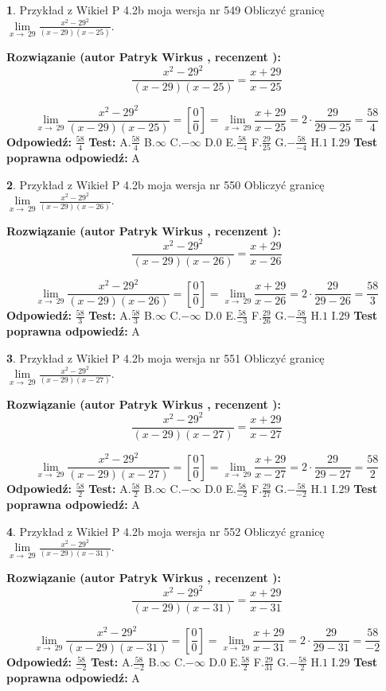 \documentclass[12pt, a4paper]{article}
\theoremstyle{definition} %
\newtheorem{zad}{}
\newcommand{\zadStart}[1]{\begin{zad}#1\newline}
\newcommand{\zadStop}{\end{zad}}
\newcommand{\rozwStart}[2]{\noindent \textbf{Rozwiązanie (autor #1 , recenzent #2): }\newline}
\newcommand{\rozwStop}{\newline}
\newcommand{\odpStart}{\noindent \textbf{Odpowiedź:}\newline}
\newcommand{\odpStop}{\newline}
\newcommand{\testStart}{\noindent \textbf{Test:}\newline}
\newcommand{\testStop}{\newline}
\newcommand{\kluczStart}{\noindent \textbf{Test poprawna odpowiedź:}\newline}
\newcommand{\kluczStop}{\newline}
\begin{document}
\zadStart{Przykład z Wikieł P 4.2b moja wersja nr 549}
Obliczyć granicę $\lim\limits_{x\to\ 29}\frac{x^{2}-29^{2}}{(x-29)(x-25)}$.
\zadStop
\rozwStart{Patryk Wirkus}{}
$$\frac{x^{2}-29^{2}}{(x-29)(x-25)}=\frac{x+29}{x-25}$$

$$\lim\limits_{x\to\ 29}\frac{x^{2}-29^{2}}{(x-29)(x-25)}=[\frac{0}{0}]=\lim\limits_{x\to\ 29}\frac{x+29}{x-25}=2 \cdot \frac{29}{29-25} = \frac{58}{4}$$
\rozwStop
\odpStart
$\frac{58}{4}$
\odpStop
\testStart
A.$\frac{58}{4}$
B.$\infty$
C.$-\infty$
D.$0$
E.$\frac{58}{-4}$
F.$\frac{29}{25}$
G.$-\frac{58}{-4}$
H.$1$
I.$29$
\testStop
\kluczStart
A
\kluczStop



\zadStart{Przykład z Wikieł P 4.2b moja wersja nr 550}
Obliczyć granicę $\lim\limits_{x\to\ 29}\frac{x^{2}-29^{2}}{(x-29)(x-26)}$.
\zadStop
\rozwStart{Patryk Wirkus}{}
$$\frac{x^{2}-29^{2}}{(x-29)(x-26)}=\frac{x+29}{x-26}$$

$$\lim\limits_{x\to\ 29}\frac{x^{2}-29^{2}}{(x-29)(x-26)}=[\frac{0}{0}]=\lim\limits_{x\to\ 29}\frac{x+29}{x-26}=2 \cdot \frac{29}{29-26} = \frac{58}{3}$$
\rozwStop
\odpStart
$\frac{58}{3}$
\odpStop
\testStart
A.$\frac{58}{3}$
B.$\infty$
C.$-\infty$
D.$0$
E.$\frac{58}{-3}$
F.$\frac{29}{26}$
G.$-\frac{58}{-3}$
H.$1$
I.$29$
\testStop
\kluczStart
A
\kluczStop



\zadStart{Przykład z Wikieł P 4.2b moja wersja nr 551}
Obliczyć granicę $\lim\limits_{x\to\ 29}\frac{x^{2}-29^{2}}{(x-29)(x-27)}$.
\zadStop
\rozwStart{Patryk Wirkus}{}
$$\frac{x^{2}-29^{2}}{(x-29)(x-27)}=\frac{x+29}{x-27}$$

$$\lim\limits_{x\to\ 29}\frac{x^{2}-29^{2}}{(x-29)(x-27)}=[\frac{0}{0}]=\lim\limits_{x\to\ 29}\frac{x+29}{x-27}=2 \cdot \frac{29}{29-27} = \frac{58}{2}$$
\rozwStop
\odpStart
$\frac{58}{2}$
\odpStop
\testStart
A.$\frac{58}{2}$
B.$\infty$
C.$-\infty$
D.$0$
E.$\frac{58}{-2}$
F.$\frac{29}{27}$
G.$-\frac{58}{-2}$
H.$1$
I.$29$
\testStop
\kluczStart
A
\kluczStop



\zadStart{Przykład z Wikieł P 4.2b moja wersja nr 552}
Obliczyć granicę $\lim\limits_{x\to\ 29}\frac{x^{2}-29^{2}}{(x-29)(x-31)}$.
\zadStop
\rozwStart{Patryk Wirkus}{}
$$\frac{x^{2}-29^{2}}{(x-29)(x-31)}=\frac{x+29}{x-31}$$

$$\lim\limits_{x\to\ 29}\frac{x^{2}-29^{2}}{(x-29)(x-31)}=[\frac{0}{0}]=\lim\limits_{x\to\ 29}\frac{x+29}{x-31}=2 \cdot \frac{29}{29-31} = \frac{58}{-2}$$
\rozwStop
\odpStart
$\frac{58}{-2}$
\odpStop
\testStart
A.$\frac{58}{-2}$
B.$\infty$
C.$-\infty$
D.$0$
E.$\frac{58}{2}$
F.$\frac{29}{31}$
G.$-\frac{58}{2}$
H.$1$
I.$29$
\testStop
\kluczStart
A
\kluczStop
\end{document}
